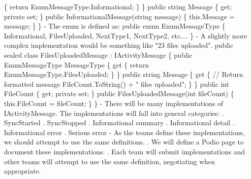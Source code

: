 \begin{DoxyCode}
                  \{
                      \textcolor{keywordflow}{return} EnumMessageType.Informational;
                  \}
              \}
              \textcolor{keyword}{public} \textcolor{keywordtype}{string} Message \{ \textcolor{keyword}{get}; \textcolor{keyword}{private} \textcolor{keyword}{set}; \}
              \textcolor{keyword}{public} InformationalMessage(\textcolor{keywordtype}{string} message)
              \{
                  this.Message = message;
              \}
          \}
    - The \textcolor{keyword}{enum} is defined as:
          \textcolor{keyword}{public} \textcolor{keyword}{enum} EnumMessageType
          \{
              Informational,
              FilesUploaded,
              NextType1,
              NextType2,
              etc....
          \}
    - A slightly more complex implementation would be something like \textcolor{stringliteral}{"23 files uploaded"}.
          \textcolor{keyword}{public} sealed \textcolor{keyword}{class }FilesUploadedMessage : IActivityMessage
          \{
              \textcolor{keyword}{public} EnumMessageType MessageType 
              \{
                  \textcolor{keyword}{get}
                  \{
                      \textcolor{keywordflow}{return} EnumMessageType.FilesUploaded;
                  \}
              \}
              \textcolor{keyword}{public} \textcolor{keywordtype}{string} Message
              \{
                  \textcolor{keyword}{get}
                  \{
                      \textcolor{comment}{// Return formatted message}
                      FileCount.ToString() + \textcolor{stringliteral}{" files uploaded"};
                  \}
              \}
              \textcolor{keyword}{public} \textcolor{keywordtype}{int} FileCount \{ \textcolor{keyword}{get}; \textcolor{keyword}{private} \textcolor{keyword}{set}; \}
              \textcolor{keyword}{public} FilesUploadedMessage(\textcolor{keywordtype}{int} fileCount)
              \{
                  this.FileCount = fileCount;
              \}
          \}
    - There will be many implementations of IActivityMessage.  The implementations will fall into general 
      categories:
      . SyncStarted
      . SyncStopped
      . Informational summary
      . Informational detail
      . Informational error
      . Serious error
    - As the teams define these implementations, we should attempt to use the same definitions.
      . We will define a Podio page to document these implementations.
      . Each team will submit implementations and other teams will attempt to use the same definition, 
      negotiating when appropriate.

\end{DoxyCode}
